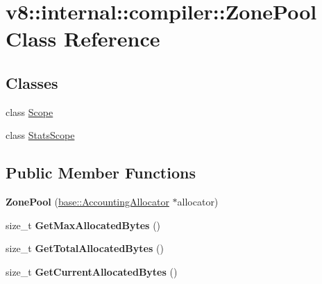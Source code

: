 \hypertarget{classv8_1_1internal_1_1compiler_1_1_zone_pool}{}\section{v8\+:\+:internal\+:\+:compiler\+:\+:Zone\+Pool Class Reference}
\label{classv8_1_1internal_1_1compiler_1_1_zone_pool}
\subsection*{Classes}
\begin{DoxyCompactItemize}
\item 
class \hyperlink{classv8_1_1internal_1_1compiler_1_1_zone_pool_1_1_scope}{Scope}
\item 
class \hyperlink{classv8_1_1internal_1_1compiler_1_1_zone_pool_1_1_stats_scope}{Stats\+Scope}
\end{DoxyCompactItemize}
\subsection*{Public Member Functions}
\begin{DoxyCompactItemize}
\item 
{\bfseries Zone\+Pool} (\hyperlink{classv8_1_1base_1_1_accounting_allocator}{base\+::\+Accounting\+Allocator} $\ast$allocator)\hypertarget{classv8_1_1internal_1_1compiler_1_1_zone_pool_a2767958dc8a795ee74824b76f701bb80}{}\label{classv8_1_1internal_1_1compiler_1_1_zone_pool_a2767958dc8a795ee74824b76f701bb80}

\item 
size\+\_\+t {\bfseries Get\+Max\+Allocated\+Bytes} ()\hypertarget{classv8_1_1internal_1_1compiler_1_1_zone_pool_ac90109f59a454fc1c8da8e0d1ffac6c8}{}\label{classv8_1_1internal_1_1compiler_1_1_zone_pool_ac90109f59a454fc1c8da8e0d1ffac6c8}

\item 
size\+\_\+t {\bfseries Get\+Total\+Allocated\+Bytes} ()\hypertarget{classv8_1_1internal_1_1compiler_1_1_zone_pool_abc7aee56bdede4b362916220ed80c49e}{}\label{classv8_1_1internal_1_1compiler_1_1_zone_pool_abc7aee56bdede4b362916220ed80c49e}

\item 
size\+\_\+t {\bfseries Get\+Current\+Allocated\+Bytes} ()\hypertarget{classv8_1_1internal_1_1compiler_1_1_zone_pool_ab5dbb35e799b0113af0244ea5d7d9c89}{}\label{classv8_1_1internal_1_1compiler_1_1_zone_pool_ab5dbb35e799b0113af0244ea5d7d9c89}

\end{DoxyCompactItemize}
